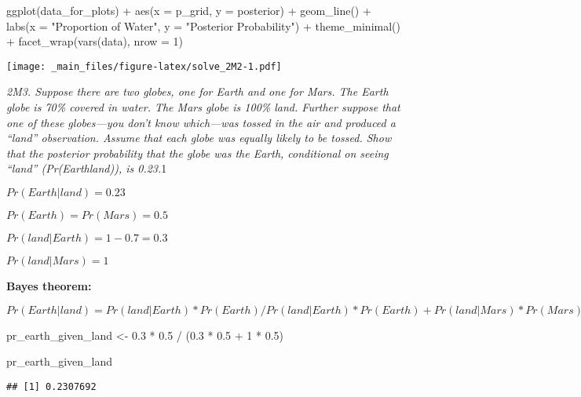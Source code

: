 \documentclass[
]{book}
\newenvironment{Shaded}{\begin{snugshade}}{\end{snugshade}}
\newcommand{\AttributeTok}[1]{\textcolor[rgb]{0.77,0.63,0.00}{#1}}
\newcommand{\DecValTok}[1]{\textcolor[rgb]{0.00,0.00,0.81}{#1}}
\newcommand{\FloatTok}[1]{\textcolor[rgb]{0.00,0.00,0.81}{#1}}
\newcommand{\FunctionTok}[1]{\textcolor[rgb]{0.00,0.00,0.00}{#1}}
\newcommand{\NormalTok}[1]{#1}
\newcommand{\OtherTok}[1]{\textcolor[rgb]{0.56,0.35,0.01}{#1}}
\newcommand{\SpecialCharTok}[1]{\textcolor[rgb]{0.00,0.00,0.00}{#1}}
\newcommand{\StringTok}[1]{\textcolor[rgb]{0.31,0.60,0.02}{#1}}
\begin{document}
\begin{Shaded}
\begin{Highlighting}[]
\FunctionTok{ggplot}\NormalTok{(data\_for\_plots) }\SpecialCharTok{+}
  \FunctionTok{aes}\NormalTok{(}\AttributeTok{x =}\NormalTok{ p\_grid, }\AttributeTok{y =}\NormalTok{ posterior) }\SpecialCharTok{+}
  \FunctionTok{geom\_line}\NormalTok{() }\SpecialCharTok{+}
  \FunctionTok{labs}\NormalTok{(}\AttributeTok{x =} \StringTok{"Proportion of Water"}\NormalTok{, }\AttributeTok{y =} \StringTok{"Posterior Probability"}\NormalTok{) }\SpecialCharTok{+}  
  \FunctionTok{theme\_minimal}\NormalTok{() }\SpecialCharTok{+}
  \FunctionTok{facet\_wrap}\NormalTok{(}\FunctionTok{vars}\NormalTok{(data), }\AttributeTok{nrow =} \DecValTok{1}\NormalTok{)}
\end{Highlighting}
\end{Shaded}

\texttt{[image: \_main\_files/figure-latex/solve\_2M2-1.pdf]}

\emph{2M3. Suppose there are two globes, one for Earth and one for Mars. The Earth globe is 70\% covered in water. The Mars globe is 100\% land. Further suppose that one of these globes---you don't know which---was tossed in the air and produced a ``land'' observation. Assume that each globe was equally likely to be tossed. Show that the posterior probability that the globe was the Earth, conditional on seeing ``land'' (Pr(Earth\textbar land)), is 0.23.}1

\(Pr(Earth|land) = 0.23\)

\(Pr(Earth) = Pr(Mars) = 0.5\)

\(Pr(land|Earth) = 1 - 0.7 = 0.3\)

\(Pr(land|Mars) = 1\)

\textbf{Bayes theorem:}

\(Pr(Earth|land) = Pr(land|Earth) * Pr(Earth) / Pr(land|Earth) * Pr(Earth) + Pr(land|Mars) * Pr(Mars)\)

\begin{Shaded}
\begin{Highlighting}[]
\NormalTok{pr\_earth\_given\_land }\OtherTok{\textless{}{-}} \FloatTok{0.3} \SpecialCharTok{*} \FloatTok{0.5} \SpecialCharTok{/}\NormalTok{ (}\FloatTok{0.3} \SpecialCharTok{*} \FloatTok{0.5} \SpecialCharTok{+} \DecValTok{1} \SpecialCharTok{*} \FloatTok{0.5}\NormalTok{)}

\NormalTok{pr\_earth\_given\_land}
\end{Highlighting}
\end{Shaded}

\begin{verbatim}
## [1] 0.2307692
\end{verbatim}
\end{document}
